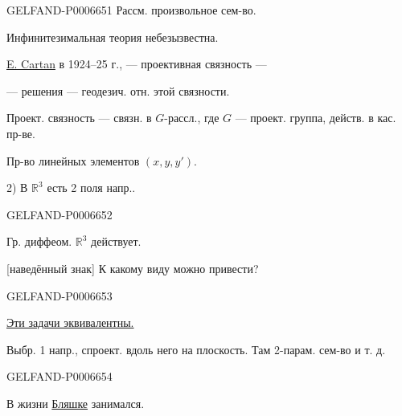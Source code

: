\begin{GelfandAdjacentEvidence}{GELFAND-P000665}{1}
Рассм. произвольное сем-во.

Инфинитезимальная теория небезызвестна.

\underline{E. Cartan} в 1924–25 г., --- проективная связность ---

--- решения --- геодезич. отн. этой связности.

Проект. связность --- связн. в \(G\)-рассл., где \(G\) --- проект. группа, действ. в кас. пр-ве.

Пр-во линейных элементов \((x,y,y')\).

2) В \(\mathbb R^3\) есть 2 поля напр..
\end{GelfandAdjacentEvidence}
\begin{GelfandAdjacentEvidence}{GELFAND-P000665}{2}


Гр. диффеом. \(\mathbb R^3\) действует.

[наведённый знак] К какому виду можно привести?
\end{GelfandAdjacentEvidence}
\begin{GelfandAdjacentEvidence}{GELFAND-P000665}{3}


\underline{Эти задачи эквивалентны.}

Выбр. 1 напр., спроект. вдоль него на плоскость. Там 2-парам. сем-во и т. д.
\end{GelfandAdjacentEvidence}
\begin{GelfandAdjacentEvidence}{GELFAND-P000665}{4}


В жизни \underline{Бляшке} занимался.
\end{GelfandAdjacentEvidence}
